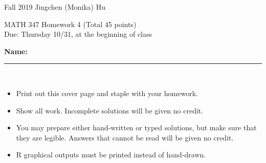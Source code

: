 \documentclass[11pt]{article}
\begin{document}
\enlargethispage{\baselineskip}

Fall 2019 \hfill Jingchen (Monika) Hu\\

\begin{center}
{\huge MATH 347 Homework 4 (Total 45 points)}	\\
Due: Thursday 10/31, at the beginning of class
\end{center}
\vspace{0.5cm}

\textbf{Name:} \rule{6cm}{0.5pt}\\


{\bf
\begin{itemize}
\item Print out this cover page and staple with your homework.
\item Show all work. Incomplete solutions will be given no credit.
\item You may prepare either hand-written or typed solutions,
but make sure that they are legible.
Answers that cannot be read will be given no credit.
\item R graphical outputs must be printed instead of hand-drawn.

\end{itemize}
}

\end{document}
